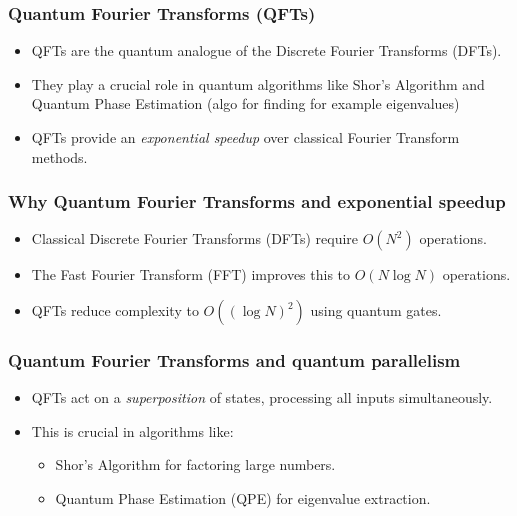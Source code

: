 \documentclass{beamer}
\begin{document}
\begin{frame}
\frametitle{Quantum Fourier Transforms (QFTs)}

\begin{itemize}
\item QFTs are the quantum analogue of the Discrete Fourier Transforms (DFTs).

\item They  play a crucial role in quantum algorithms like Shor’s Algorithm and Quantum Phase Estimation (algo for finding for example eigenvalues)

\item QFTs provide an \emph{exponential speedup} over classical Fourier Transform methods.
\end{itemize}

\noindent
\end{frame}

\begin{frame}
\frametitle{Why Quantum Fourier Transforms and exponential speedup}

\begin{itemize}
\item Classical Discrete Fourier Transforms (DFTs) require $O(N^2)$ operations.

\item The Fast Fourier Transform (FFT) improves this to $O(N \log N)$ operations.

\item QFTs reduce complexity to $O((\log N)^2)$ using quantum gates.
\end{itemize}

\noindent
\end{frame}

\begin{frame}
\frametitle{Quantum Fourier Transforms and quantum parallelism}

\begin{itemize}
\item QFTs act on a \emph{superposition} of states, processing all inputs simultaneously.

\item This is crucial in algorithms like:
\begin{itemize}

  \item Shor’s Algorithm for factoring large numbers.

  \item Quantum Phase Estimation (QPE) for eigenvalue extraction.
\end{itemize}

\noindent
\end{itemize}

\noindent
\end{frame}
\end{document}
